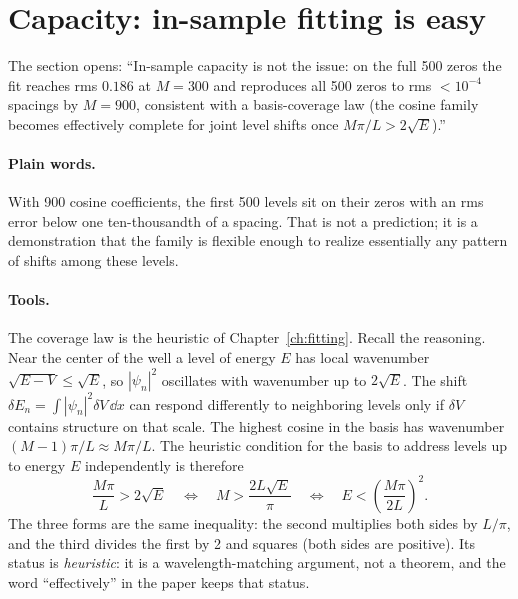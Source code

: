 \section{Capacity: in-sample fitting is easy}\label{sec:paper-memorization-capacity}

The section opens: ``In-sample capacity is not the issue: on the full 500 zeros the fit reaches rms $0.186$ at $M = 300$ and reproduces all 500 zeros to rms $< 10^{-4}$ spacings by $M = 900$, consistent with a basis-coverage law (the cosine family becomes effectively complete for joint level shifts once $M\pi/L > 2\sqrt{E}$).''

\paragraph{Plain words.} With 900 cosine coefficients, the first 500 levels sit on their zeros with an rms error below one ten-thousandth of a spacing. That is not a prediction; it is a demonstration that the family is flexible enough to realize essentially any pattern of shifts among these levels.

\paragraph{Tools.} The coverage law is the heuristic of Chapter~\ref{ch:fitting}. Recall the reasoning. Near the center of the well a level of energy $E$ has local wavenumber $\sqrt{E-V}\le\sqrt E$, so $|\psi_n|^2$ oscillates with wavenumber up to $2\sqrt E$. The shift $\delta E_n=\int|\psi_n|^2\delta V\,\dd x$ can respond differently to neighboring levels only if $\delta V$ contains structure on that scale. The highest cosine in the basis has wavenumber $(M-1)\pi/L\approx M\pi/L$. The heuristic condition for the basis to address levels up to energy $E$ independently is therefore
\begin{equation}
\frac{M\pi}{L}>2\sqrt E
\quad\Longleftrightarrow\quad
M>\frac{2L\sqrt E}{\pi}
\quad\Longleftrightarrow\quad
E<\left(\frac{M\pi}{2L}\right)^2 .
\label{eq:paper-memorization-coverage}
\end{equation}
The three forms are the same inequality: the second multiplies both sides by $L/\pi$, and the third divides the first by 2 and squares (both sides are positive). Its status is \emph{heuristic}: it is a wavelength-matching argument, not a theorem, and the word ``effectively'' in the paper keeps that status.

